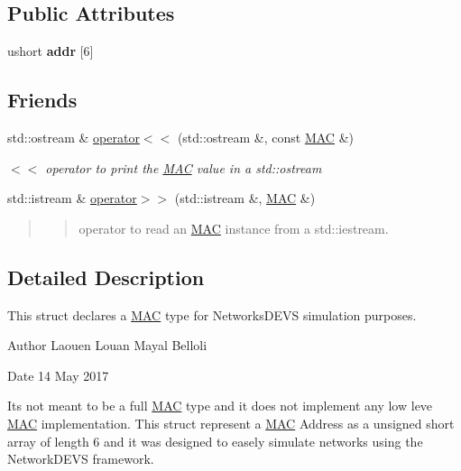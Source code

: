 \subsection*{Public Attributes}
\begin{DoxyCompactItemize}
\item 
ushort {\bfseries addr} \mbox{[}6\mbox{]}\hypertarget{structMAC_ab531c8e187a772159d8bcb887ed482a8}{}\label{structMAC_ab531c8e187a772159d8bcb887ed482a8}

\end{DoxyCompactItemize}
\subsection*{Friends}
\begin{DoxyCompactItemize}
\item 
std\+::ostream \& \hyperlink{structMAC_a72c483e874958475fa33b97cda3db056}{operator$<$$<$} (std\+::ostream \&, const \hyperlink{structMAC}{M\+AC} \&)
\begin{DoxyCompactList}\small\item\em $<$$<$ operator to print the \hyperlink{structMAC}{M\+AC} value in a std\+::ostream \end{DoxyCompactList}\item 
std\+::istream \& \hyperlink{structMAC_ad48783b1ca0c6721e6e001a32dfc6d05}{operator$>$$>$} (std\+::istream \&, \hyperlink{structMAC}{M\+AC} \&)
\begin{DoxyCompactList}\small\item\em \begin{quote}
\begin{quote}
operator to read an \hyperlink{structMAC}{M\+AC} instance from a std\+::iestream. \end{quote}
\end{quote}
\end{DoxyCompactList}\end{DoxyCompactItemize}


\subsection{Detailed Description}
This struct declares a \hyperlink{structMAC}{M\+AC} type for Networks\+D\+E\+VS simulation purposes. 

\begin{DoxyAuthor}{Author}
Laouen Louan Mayal Belloli 
\end{DoxyAuthor}
\begin{DoxyDate}{Date}
14 May 2017
\end{DoxyDate}
It\textquotesingle{}s not meant to be a full \hyperlink{structMAC}{M\+AC} type and it does not implement any low leve \hyperlink{structMAC}{M\+AC} implementation. This struct represent a \hyperlink{structMAC}{M\+AC} Address as a unsigned short array of length 6 and it was designed to easely simulate networks using the Network\+D\+E\+VS framework. 

